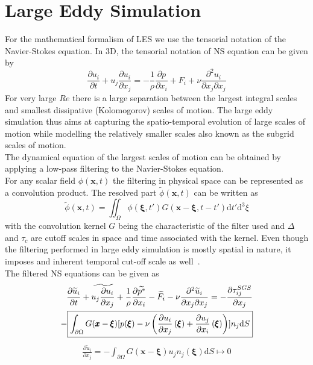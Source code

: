 \section{Large Eddy Simulation}\label{les}
For the mathematical formalism of LES we use the tensorial notation of the Navier-Stokes equation. In 3D, the tensorial notation of NS equation can be given by
\begin{equation}
\frac{\partial {u}_i}{\partial t} + {u}_j\frac{\partial {u}_i}{\partial x_j} = -\frac{1}{\rho}\frac{\partial {p}}{\partial x_i}  + {F_{i}} + \nu\frac{\partial^2{u}_i}{\partial x_j \partial x_j} \label{nseq}
\end{equation}
For very large $Re$ there is a large separation between the largest integral scales and smallest dissipative (Kolomogorov) scales of motion. The large eddy simulation thus aims at capturing the spatio-temporal evolution of large scales of motion while modelling the relatively smaller scales also known as the subgrid scales of motion. \\
The dynamical equation of the largest scales of motion can be obtained by applying a low-pass filtering to the Navier-Stokes equation.\\
For any scalar field $\phi(\pmb{x},t)$ the filtering in physical space can be represented as a convolution product. The resolved part $\widetilde{\phi}(\pmb{x},t)$ can be written as
\begin{equation}
\widetilde{\phi}(\pmb{x},t) = \iint_{\Omega}
\phi(\pmb{\xi},t')G(\pmb{x}-\pmb{\xi},t-t')\mathrm{d}t'\mathrm{d}^3\xi
\end{equation}
with the convolution kernel $G$ being the characteristic of the filter used and $\Delta$ and $\tau_c$ are cutoff scales in space and time associated with the kernel. Even though the filtering performed in large eddy simulation is mostly spatial in nature,  it imposes and inherent temporal cut-off scale as well~\cite{sag}.\\
The filtered NS equations can be given as
\begin{equation}
 \begin{split}
 \frac{\partial \widetilde{u}_i}{\partial t} + \widetilde{{u}_j\frac{\partial {u}_i}{\partial x_j}} + \frac{1}{\rho}\frac{\partial \widetilde{p^{*}}}{\partial x_i}  -\widetilde{F}_{i}  - \nu\frac{\partial^2\widetilde{u}_i}{\partial x_j \partial x_j}  = - \frac{\partial \tau^{\small SGS}_{ij}}{\partial x_j} \\ 
 -\boxed{\int_{\partial \Omega} G( \pmb{x} - \pmb{\xi} )[p(\pmb{\xi}) - \nu\left(\frac{\partial {u}_i}{\partial x_j}\left(\pmb{\xi}\right) + \frac{\partial {u}_j}{\partial x_i}\left(\pmb{\xi}\right) \right)]n_j \mathrm{d}S} \label{eqbc1}
 \end{split}
 \end{equation} 
 \begin{equation}
 \begin{split}
  \frac{\partial \widetilde{u}_i}{\partial x_j} = - \boxed{\int_{\partial \Omega} G\left(\pmb{x} -  \pmb{\xi}\right)u_jn_j(\pmb{\xi})\mathrm{d}S} \mapsto 0 \label{eqbc2}
 \end{split}
 \end{equation} 

